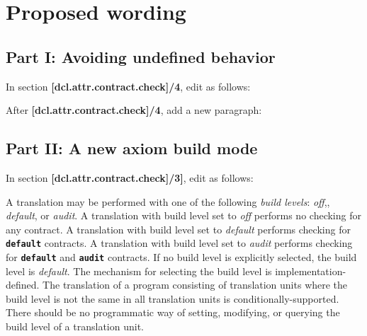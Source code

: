 \section{Proposed wording}

\subsection{Part I: Avoiding undefined behavior}

In section \textbf{[dcl.attr.contract.check]/4}, edit as follows:

\vspace{2em}

{\addtolength{\leftskip}{5em}
\noindent{}
}

\vspace{2em}

After \textbf{[dcl.attr.contract.check]/4}, add a new paragraph:

\vspace{2em}

{\addtolength{\leftskip}{3em}
\noindent{}
}

\subsection{Part II: A new axiom build mode}

In section \textbf{[dcl.attr.contract.check]/3]}, edit as follows:

\vspace{2em}

{\addtolength{\leftskip}{5em}
A translation may be performed with one of the following \emph{build levels}: 
\emph{off},, \emph{default}, or \emph{audit}. 
A translation with build level set to \emph{off}  performs no checking for any contract.
A translation with build level set to \emph{default} performs checking for \textbf{\texttt{default}} contracts. 
A translation with build level set to \emph{audit} performs checking for \textbf{\texttt{default}} and 
\textbf{\texttt{audit}} contracts. 
If no build level is explicitly selected, the build level is \emph{default}. 
The mechanism for selecting the build level is implementation-defined. 
The translation of a program consisting of translation units where the build level is not the same in all translation units is conditionally-supported. 
There should be no programmatic way of setting, modifying, or querying the build level of a translation unit.
}
